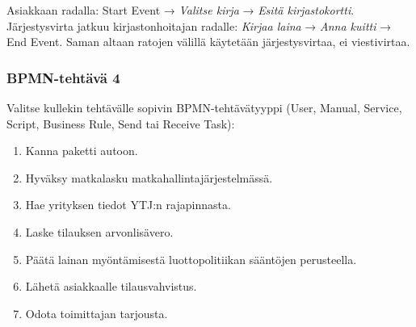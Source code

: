 \documentclass[
  finnish,
  letterpaper,
  DIV=11,
  numbers=noendperiod,
  oneside]{scrreprt}
\providecommand{\tightlist}{%
  \setlength{\itemsep}{0pt}\setlength{\parskip}{0pt}}
\begin{document}
\begin{tcolorbox}[enhanced jigsaw, arc=.35mm, bottomrule=.15mm, bottomtitle=1mm, breakable, colback=white, colbacktitle=quarto-callout-tip-color!10!white, colframe=quarto-callout-tip-color-frame, coltitle=black, left=2mm, leftrule=.75mm, opacityback=0, opacitybacktitle=0.6, rightrule=.15mm, title=\textcolor{quarto-callout-tip-color}{\faLightbulb}\hspace{0.5em}{Malliratkaisu}, titlerule=0mm, toprule=.15mm, toptitle=1mm]

Asiakkaan radalla: Start Event → \emph{Valitse kirja} → \emph{Esitä
kirjastokortti}. Järjestysvirta jatkuu kirjastonhoitajan radalle:
\emph{Kirjaa laina} → \emph{Anna kuitti} → End Event. Saman altaan
ratojen välillä käytetään järjestysvirtaa, ei viestivirtaa.

\end{tcolorbox}

\subsubsection{BPMN-tehtävä 4}\label{bpmn-tehtuxe4vuxe4-4}

Valitse kullekin tehtävälle sopivin BPMN-tehtävätyyppi (User, Manual,
Service, Script, Business Rule, Send tai Receive Task):

\begin{enumerate}
\def\labelenumi{\arabic{enumi}.}
\tightlist
\item
  Kanna paketti autoon.
\item
  Hyväksy matkalasku matkahallintajärjestelmässä.
\item
  Hae yrityksen tiedot YTJ:n rajapinnasta.
\item
  Laske tilauksen arvonlisävero.
\item
  Päätä lainan myöntämisestä luottopolitiikan sääntöjen perusteella.
\item
  Lähetä asiakkaalle tilausvahvistus.
\item
  Odota toimittajan tarjousta.
\end{enumerate}
\end{document}
